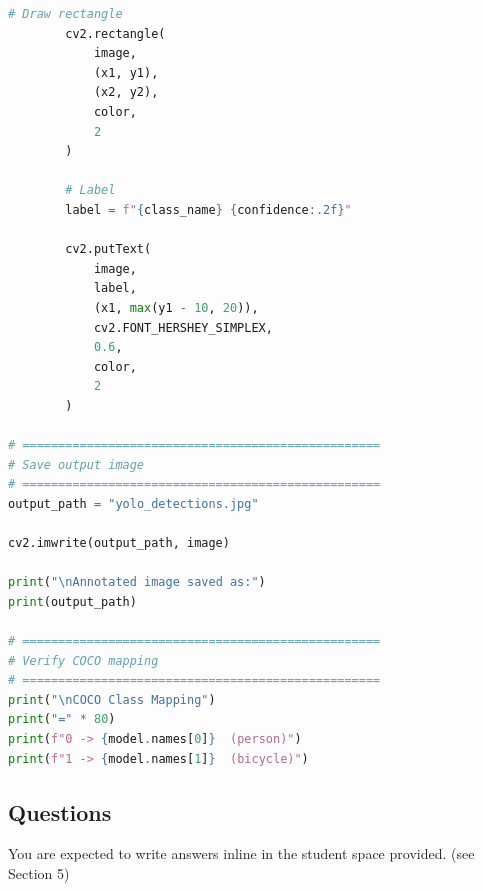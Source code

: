 \documentclass[12pt,a4paper]{article}
\newenvironment{studentSpace}{\par\medskip\noindent}{\par\bigskip}
\begin{document}
\begin{studentSpace}
\begin{lstlisting}[language=Python]
        # Draw rectangle
        cv2.rectangle(
            image,
            (x1, y1),
            (x2, y2),
            color,
            2
        )

        # Label
        label = f"{class_name} {confidence:.2f}"

        cv2.putText(
            image,
            label,
            (x1, max(y1 - 10, 20)),
            cv2.FONT_HERSHEY_SIMPLEX,
            0.6,
            color,
            2
        )

# ==================================================
# Save output image
# ==================================================
output_path = "yolo_detections.jpg"

cv2.imwrite(output_path, image)

print("\nAnnotated image saved as:")
print(output_path)

# ==================================================
# Verify COCO mapping
# ==================================================
print("\nCOCO Class Mapping")
print("=" * 80)
print(f"0 -> {model.names[0]}  (person)")
print(f"1 -> {model.names[1]}  (bicycle)")
\end{lstlisting}

\end{studentSpace}

\subsection{Questions}

You are expected to write answers inline in the student space provided. (see Section 5)
\end{document}
